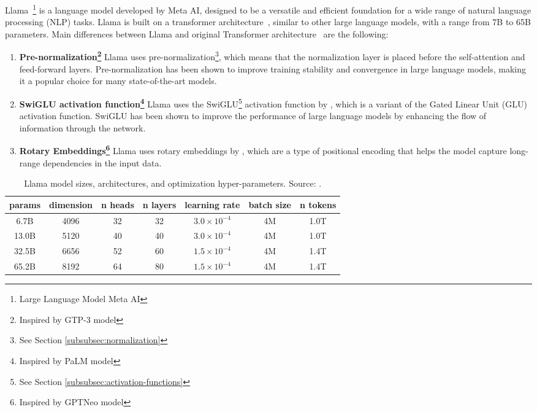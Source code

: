 Llama~\footnote{Large Language Model Meta AI} is a language model developed by Meta AI, designed to be a versatile and efficient foundation for a wide range of natural language processing (NLP) tasks.
Llama is built on a transformer architecture~\cite{vaswani2023attention}, similar to other large language models, with a range from 7B to 65B parameters.
Main differences between Llama and original Transformer architecture~\cite{vaswani2023attention} are the following:
\begin{enumerate}
	\item \textbf{Pre-normalization\footnote{Inspired by GTP-3 model}} {Llama uses pre-normalization\footnote{See Section \ref{subsubsec:normalization}}, which means that the normalization layer is placed before the self-attention and feed-forward layers.
		      Pre-normalization has been shown to improve training stability and convergence in large language models, making it a popular choice for many state-of-the-art models.
	      }
	\item \textbf{SwiGLU activation function\footnote{Inspired by PaLM model}} {Llama uses the SwiGLU\footnote{See Section \ref{subsubsec:activation-functions}} activation function by \textcite{shazeer2020glu}, which is a variant of the Gated Linear Unit (GLU) activation function.
		      SwiGLU has been shown to improve the performance of large language models by enhancing the flow of information through the network.
	      }
	\item \textbf{Rotary Embeddings\footnote{Inspired by GPTNeo model}} {Llama uses rotary embeddings by \textcite{su2021roformer}, which are a type of positional encoding that helps the model capture long-range dependencies in the input data.
	      }
\end{enumerate}

\begin{table}[ht]
	\centering
	\begin{tabular}{@{}ccccccc@{}}
		\toprule
		params & dimension & n heads & n layers & learning rate          & batch size & n tokens \\
		\midrule
		6.7B   & 4096      & 32      & 32       & \(3.0 \times 10^{-4}\) & 4M         & 1.0T     \\
		13.0B  & 5120      & 40      & 40       & \(3.0 \times 10^{-4}\) & 4M         & 1.0T     \\
		32.5B  & 6656      & 52      & 60       & \(1.5 \times 10^{-4}\) & 4M         & 1.4T     \\
		65.2B  & 8192      & 64      & 80       & \(1.5 \times 10^{-4}\) & 4M         & 1.4T     \\
		\bottomrule
	\end{tabular}
	\caption{Llama model sizes, architectures, and optimization hyper-parameters. Source: \textcite{touvron2023llama}.}
	\label{tab:llama-model-params}
\end{table}

